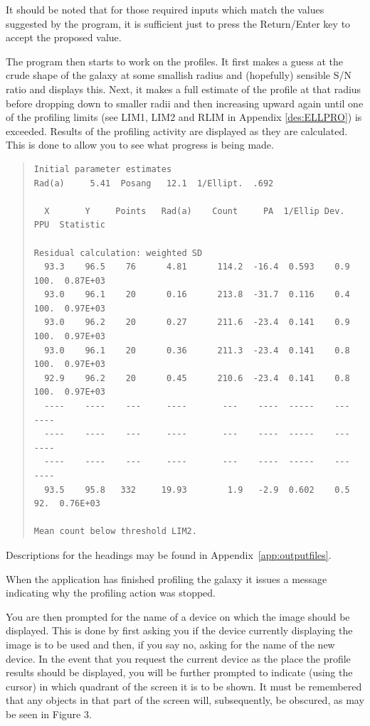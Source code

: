 \documentclass[twoside,11pt]{article}
\newenvironment{myquote}{\begin{quote}\begin{small}}{\end{small}\end{quote}}
\begin{document}
It should be noted that for those required inputs which match the
values suggested by the program, it is sufficient just to press
the Return/Enter key to accept the proposed value.

The program then starts to work on the profiles. It first makes a guess at
the crude shape of the galaxy at some smallish radius and (hopefully)
sensible S/N ratio and displays this.
Next, it makes a full estimate of the profile at that radius before dropping
down to smaller radii and then increasing upward again until
one of the profiling limits (see LIM1, LIM2 and RLIM in Appendix
\ref{des:ELLPRO})
is exceeded. Results of the
profiling activity are displayed as they are calculated. This is done to allow
you to see what progress is being made.

\begin{myquote}
\begin{verbatim}
Initial parameter estimates
Rad(a)     5.41  Posang   12.1  1/Ellipt.  .692

  X       Y     Points   Rad(a)    Count     PA  1/Ellip Dev.  PPU  Statistic

Residual calculation: weighted SD
  93.3    96.5    76      4.81      114.2  -16.4  0.593    0.9  100.  0.87E+03
  93.0    96.1    20      0.16      213.8  -31.7  0.116    0.4  100.  0.97E+03
  93.0    96.2    20      0.27      211.6  -23.4  0.141    0.9  100.  0.97E+03
  93.0    96.1    20      0.36      211.3  -23.4  0.141    0.8  100.  0.97E+03
  92.9    96.2    20      0.45      210.6  -23.4  0.141    0.8  100.  0.97E+03
  ----    ----    ---     ----       ---    ----  -----    ---  ----
  ----    ----    ---     ----       ---    ----  -----    ---  ----
  ----    ----    ---     ----       ---    ----  -----    ---  ----
  93.5    95.8   332     19.93        1.9   -2.9  0.602    0.5   92.  0.76E+03

Mean count below threshold LIM2.
\end{verbatim}
\end{myquote}

Descriptions for the headings may be found in Appendix~\ref{app:outputfiles}.

When the application has finished profiling the galaxy it issues a message
indicating why the profiling action was stopped.

You are then prompted for the name of a device on which the image should be
displayed. This is done by first asking you if the device currently displaying
the image is to be used
and then, if you say no, asking for the name of the new device. In the event
that you request the current device as the place the profile results should be
displayed, you will be further prompted to indicate (using the cursor) in which
quadrant of the
screen it is to be shown. It must be remembered that any objects in that part
of the screen will, subsequently, be obscured, as may be seen in Figure 3.
\end{document}
